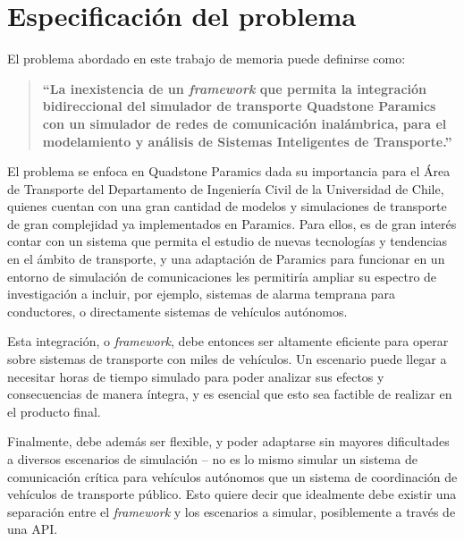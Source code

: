 \section{Especificación del problema}\label{sec:problemspecs}

El problema abordado en este trabajo de memoria puede definirse como: 
\begin{quote}
    \textbf{``La inexistencia de un \emph{framework} que permita la integración bidireccional del simulador de transporte Quadstone Paramics con un simulador de redes de comunicación inalámbrica, para el modelamiento y análisis de Sistemas Inteligentes de Transporte.''}
\end{quote}

El problema se enfoca en Quadstone Paramics dada su importancia para el Área de Transporte del Departamento de Ingeniería Civil de la Universidad de Chile, quienes cuentan con una gran cantidad de modelos y simulaciones de transporte de gran complejidad ya implementados en Paramics.
Para ellos, es de gran interés contar con un sistema que permita el estudio de nuevas tecnologías y tendencias en el ámbito de transporte, y una adaptación de Paramics para funcionar en un entorno de simulación de comunicaciones les permitiría ampliar su espectro de investigación a incluir, por ejemplo, sistemas de alarma temprana para conductores, o directamente sistemas de vehículos autónomos.

Esta integración, o \emph{framework}, debe entonces ser altamente eficiente para operar sobre sistemas de transporte con miles de vehículos. Un escenario puede llegar a necesitar horas de tiempo simulado para poder analizar sus efectos y consecuencias de manera íntegra, y es esencial que esto sea factible de realizar en el producto final.

Finalmente, debe además ser flexible, y poder adaptarse sin mayores dificultades a diversos escenarios de simulación -- no es lo mismo simular un sistema de comunicación crítica para vehículos autónomos que un sistema de coordinación de vehículos de transporte público. Esto quiere decir que idealmente debe existir una separación entre el \emph{framework} y los escenarios a simular, posiblemente a través de una API.
